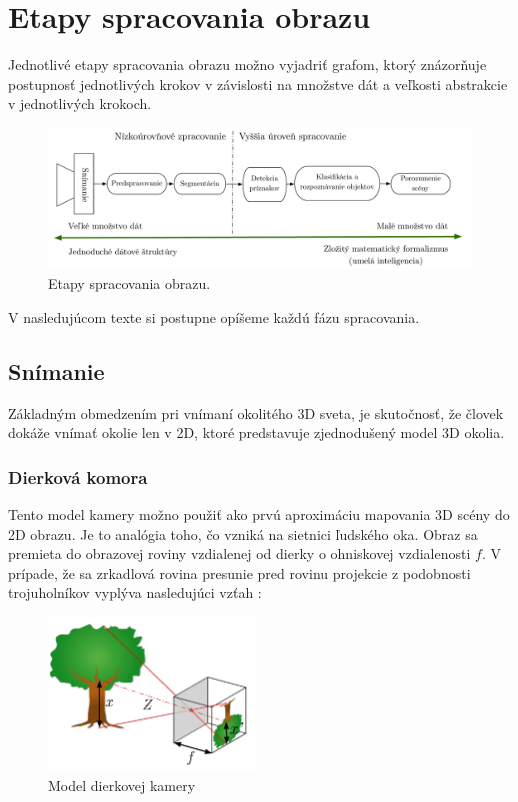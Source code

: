 \section{Etapy spracovania obrazu}

Jednotlivé etapy spracovania obrazu možno vyjadriť grafom, ktorý znázorňuje postupnosť jednotlivých krokov v závislosti na množstve dát a veľkosti abstrakcie v jednotlivých krokoch. \cite{Analysis_and_Machine_Vision} 

\begin{figure}[H]
\begin{center}
	\includegraphics[scale=0.45]{images/phaseCV}
	\caption{Etapy spracovania obrazu.}
	\end{center}
\end{figure}

V nasledujúcom texte si postupne opíšeme každú fázu spracovania. 


\subsection{Snímanie}
Základným obmedzením pri vnímaní okolitého 3D sveta, je skutočnosť, že človek dokáže vnímať okolie len v 2D, ktoré predstavuje zjednodušený model 3D okolia.


\subsubsection{Dierková komora} Tento model kamery možno použiť ako prvú aproximáciu mapovania 3D scény do 2D obrazu. Je to analógia toho, čo vzniká na sietnici ľudského oka. Obraz sa premieta do obrazovej roviny vzdialenej od dierky o ohniskovej vzdialenosti $f$. V prípade, že sa zrkadlová rovina presunie pred rovinu projekcie z podobnosti trojuholníkov vyplýva nasledujúci vzťah \cite{Pin_hole_camera}\cite{pocitacove_videnie_v_praxi}:



\begin{figure}[H]
\begin{center}
	\includegraphics[width=5.5cm]{images/holeCamera}
	\caption{Model dierkovej kamery}
	\end{center}
\end{figure}

